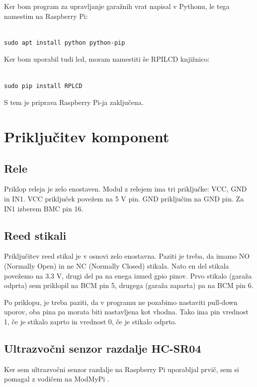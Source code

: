 \documentclass[11pt]{article}
\begin{document}
Ker bom program za upravljanje garažnih vrat napisal v Pythonu, le tega namestim na Raspberry Pi:
\begin{verbatim}

sudo apt install python python-pip
\end{verbatim}

Ker bom uporabil tudi \gls{lcd}, moram namestiti še RPILCD knjižnico:

\begin{verbatim}

sudo pip install RPLCD
\end{verbatim}

S tem je priprava Raspberry Pi-ja zaključena.

\section{Priključitev komponent}
\subsection{Rele}
Priklop releja je zelo enostaven. Modul z relejem ima tri priključke: VCC, GND in IN1. VCC priključek povežem na 5 V pin. GND priključim na GND pin. Za IN1 izberem BMC pin 16.

\subsection{Reed stikali}
Priključitev reed stikal je v osnovi zelo enostavna. Paziti je treba, da imamo NO (Normally Open) in ne NC (Normally Closed) stikala. Nato en del stikala povežemo na 3.3 V, drugi del pa na enega izmed \gls{gpio} pinov. Prvo stikalo (garaža odprta) sem priklopil na BCM pin 5, drugega (garaža zaparta) pa na BCM pin 6.

Po priklopu, je treba paziti, da v programu ne pozabimo nastaviti pull-down uporov, oba pina pa morata biti nastavljena kot vhodna. Tako ima pin vrednost 1, če je stikalo zaprto in vrednost 0, če je stikalo odprto.

\subsection{Ultrazvočni senzor razdalje HC-SR04}
Ker sem ultrazvočni senzor razdalje na Raspberry Pi uporabljal prvič, sem si pomagal z vodičem na ModMyPi \cite{ModMyPi_us}.
\end{document}

